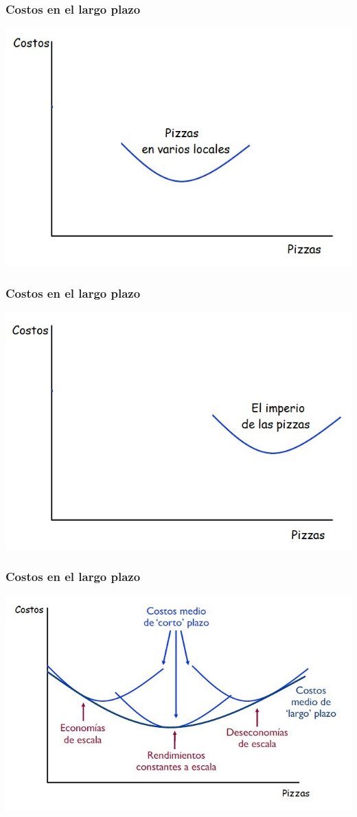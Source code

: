 \documentclass{beamer}
\begin{document}
\begin{frame}
\frametitle{Costos en el largo plazo}
\centering
\includegraphics[scale=0.6]{../Figures/Tema_06.25.jpg}
\end{frame}

\begin{frame}
\frametitle{Costos en el largo plazo}
\centering
\includegraphics[scale=0.6]{../Figures/Tema_06.26.jpg}
\end{frame}

\begin{frame}
\frametitle{Costos en el largo plazo}
\centering
\includegraphics[scale=0.6]{../Figures/Tema_06.25_costos4.jpg}
\end{frame}
\end{document}
